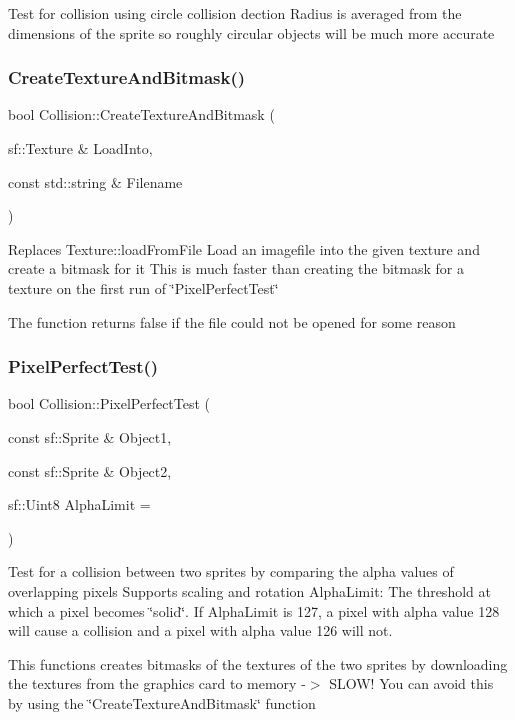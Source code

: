 Test for collision using circle collision dection Radius is averaged from the dimensions of the sprite so roughly circular objects will be much more accurate \mbox{\label{namespace_collision_a22b8e23d7fc5cb243d4365d1c179cf39}} 
\subsubsection{\texorpdfstring{CreateTextureAndBitmask()}{CreateTextureAndBitmask()}}
{\footnotesize\ttfamily bool Collision\+::\+Create\+Texture\+And\+Bitmask (\begin{DoxyParamCaption}\item[{sf\+::\+Texture \&}]{Load\+Into,  }\item[{const std\+::string \&}]{Filename }\end{DoxyParamCaption})}

Replaces Texture\+::load\+From\+File Load an imagefile into the given texture and create a bitmask for it This is much faster than creating the bitmask for a texture on the first run of \char`\"{}\+Pixel\+Perfect\+Test\char`\"{}

The function returns false if the file could not be opened for some reason \mbox{\label{namespace_collision_a5514da2189b7230dd266ac6ada2fcc5b}} 
\subsubsection{\texorpdfstring{PixelPerfectTest()}{PixelPerfectTest()}}
{\footnotesize\ttfamily bool Collision\+::\+Pixel\+Perfect\+Test (\begin{DoxyParamCaption}\item[{const sf\+::\+Sprite \&}]{Object1,  }\item[{const sf\+::\+Sprite \&}]{Object2,  }\item[{sf\+::\+Uint8}]{Alpha\+Limit = {} }\end{DoxyParamCaption})}

Test for a collision between two sprites by comparing the alpha values of overlapping pixels Supports scaling and rotation Alpha\+Limit\+: The threshold at which a pixel becomes \char`\"{}solid\char`\"{}. If Alpha\+Limit is 127, a pixel with alpha value 128 will cause a collision and a pixel with alpha value 126 will not.

This functions creates bitmasks of the textures of the two sprites by downloading the textures from the graphics card to memory -\/$>$ S\+L\+O\+W! You can avoid this by using the \char`\"{}\+Create\+Texture\+And\+Bitmask\char`\"{} function 